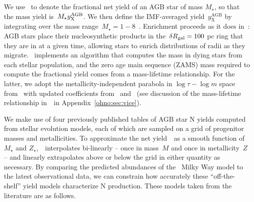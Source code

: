 We use~ to denote the fractional net yield of an AGB star of mass
$M_\star$, so that the mass yield is~$M_\star y_\text{X}^\text{AGB}$.
We then define the IMF-averaged yield~$y_\text{X}^\text{AGB}$ by integrating
over the mass range~$M_\star = 1 - 8$~\msun.
Enrichment proceeds as it does in~\citet{Johnson2021}: AGB stars place their
nucleosynthetic products in the~$\delta R_\text{gal} = 100$ pc ring that they are in at
a given time, allowing stars to enrich distributions of radii as they migrate.
\vice~implements an algorithm that computes the mass in dying stars
from each stellar population, and the zero age main sequence (ZAMS) mass
required to compute the fractional yield comes from a mass-lifetime
relationship. 
For the latter, we adopt the metallicity-independent parabola in
$\log\tau - \log m$ space from~\citet{Larson1974} with updated coefficients
from~\citet{Kobayashi2004} and~\citet*{David1990} (see discussion of the
mass-lifetime relationship in~\vice~in Appendix~\ref{ohno:sec:vice}).
\par
We make use of four previously published tables of AGB star N yields
computed from stellar evolution models, each of which are sampled on a grid
of progenitor masses and metallicities.
To approximate the net yield~~as a smooth function of~$M_\star$ and
$Z_\star$,~\vice~interpolates bi-linearly -- once in mass~$M$ and once in
metallicity~$Z$ -- and linearly extrapolates above or below the grid in either
quantity as necessary.
By comparing the predicted abundances of the~\citet{Johnson2021} Milky Way
model to the latest observational data, we can constrain how accurately these
``off-the-shelf'' yield models characterize N production.
These models taken from the literature are as follows.
